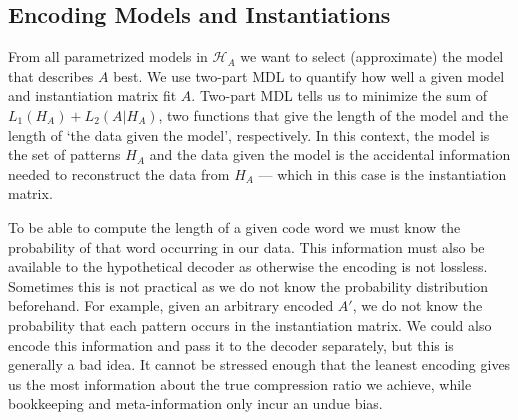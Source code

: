 \documentclass{llncs}
\begin{document}

\subsection{Encoding Models and Instantiations}

From all parametrized models in $\mathcal{H}_A$ we want to select (approximate) the model that describes $A$ best. We use two-part MDL to quantify how well a given model and instantiation matrix fit $A$. Two-part MDL tells us to minimize the sum of $L_1(H_A) + L_2(A|H_A)$, two functions that give the length of the model and the length of `the data given the model', respectively. In this context, the model is the set of patterns $H_A$ and the data given the model is the accidental information needed to reconstruct the data from $H_A$ --- which in this case is the instantiation matrix.

To be able to compute the length of a given code word we must know the probability of that word occurring in our data. This information must also be available to the hypothetical decoder as otherwise the encoding is not lossless. Sometimes this is not practical as we do not know the probability distribution beforehand. For example, given an arbitrary encoded $A'$, we do not know the probability that each pattern occurs in the instantiation matrix. We could also encode this information and pass it to the decoder separately, but this is generally a bad idea. It cannot be stressed enough that the leanest encoding gives us the most information about the true compression ratio we achieve, while bookkeeping and meta-information only incur an undue bias. 
\end{document}
